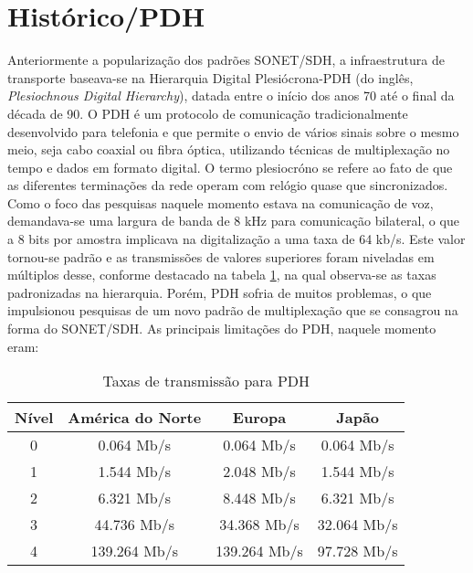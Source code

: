 \documentclass[a4paper,12pt]{article}
\begin{document}
\section{Histórico/PDH}

Anteriormente a popularização dos padrões SONET/SDH, a infraestrutura de transporte baseava-se na Hierarquia Digital Plesiócrona-PDH ({do inglês, \it Plesiochnous Digital Hierarchy}), datada entre o início dos anos 70 até o final da década de 90. O PDH é um protocolo de comunicação tradicionalmente desenvolvido para telefonia e que permite o envio de vários sinais sobre o mesmo meio, seja cabo coaxial ou fibra óptica, utilizando técnicas de multiplexação no tempo e dados em formato digital. O termo plesiocróno se refere ao fato de que as diferentes terminações da rede operam com relógio quase que sincronizados. Como o foco das pesquisas naquele momento estava na comunicação de voz, demandava-se uma largura de banda de 8 kHz para comunicação bilateral, o que a 8 bits por amostra implicava na digitalização a uma taxa de 64 kb/s. Este valor tornou-se padrão e as transmissões de valores superiores foram niveladas em múltiplos desse, conforme destacado na tabela \ref{tab1}, na qual observa-se as taxas padronizadas na hierarquia. Porém, PDH sofria de muitos problemas, o que impulsionou pesquisas de um novo padrão de multiplexação que se consagrou na forma do SONET/SDH. As principais limitações do PDH, naquele momento eram:

\begin{table}
\centering
\begin{tabular}{c|c|c|c}
\hline
{\bf Nível} & {\bf América do Norte} & {\bf Europa} & {\bf Japão} \\ \hline
0 & 0.064 Mb/s & 0.064 Mb/s & 0.064 Mb/s \\
1 & 1.544 Mb/s & 2.048 Mb/s & 1.544 Mb/s \\
2 & 6.321 Mb/s & 8.448 Mb/s & 6.321 Mb/s \\
3 & 44.736 Mb/s & 34.368 Mb/s & 32.064 Mb/s \\
4 & 139.264 Mb/s & 139.264 Mb/s & 97.728 Mb/s \\ \hline
\end{tabular}
\caption{Taxas de transmissão para PDH \cite{ramaswami} \label{tab1}}
\end{table}
\end{document}
